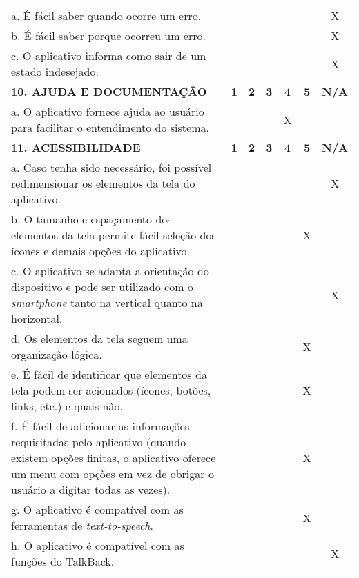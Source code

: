 \documentclass[portuguese,oneside]{tcc}
\begin{document}
\begin{center}
\begin{longtabu}{|L{25em}|c|c|c|c|c|c|}
																												a. É fácil saber quando ocorre um erro.	& & & & & & X \\ 
																												b. É fácil saber porque ocorreu um erro. & & & & & & X \\ 
																												c. O aplicativo informa como sair de um estado indesejado. & & & & & & X \\ 
																												\textbf{10. AJUDA E DOCUMENTAÇÃO} & \textbf{1} & \textbf{2} & \textbf{3} & \textbf{4} & \textbf{5} & \textbf{N/A} \\ 
																												a. O aplicativo fornece ajuda ao usuário para facilitar o entendimento do sistema. & & & & X & & \\ 
																												\textbf{11. ACESSIBILIDADE} & \textbf{1} & \textbf{2} & \textbf{3} & \textbf{4} & \textbf{5} & \textbf{N/A} \\ 
																												a. Caso tenha sido necessário, foi possível redimensionar os elementos da tela do aplicativo. & & & & & & X \\ 
																												b. O tamanho e espaçamento dos elementos da tela permite fácil seleção dos ícones e demais opções do aplicativo. & & & & & X & \\ 
																												c. O aplicativo se adapta a orientação do dispositivo e pode ser utilizado com o \emph{smartphone} tanto na vertical quanto na horizontal. & & & & & & X \\ 
																												d. Os elementos da tela seguem uma organização lógica. & & & & & X & \\ 
																												e. É fácil de identificar que elementos da tela podem ser acionados (ícones, botões, links, etc.) e quais não. & & & & & X & \\ 
																												f. É fácil de adicionar as informações requisitadas pelo aplicativo (quando existem opções finitas, o aplicativo oferece um menu com opções em vez de obrigar o usuário a digitar todas as vezes). & & & & & X & \\ 
																												g. O aplicativo é compatível com as ferramentas de \emph{text-to-speech}. & & & & & X & \\ 
																												h. O aplicativo é compatível com as funções do TalkBack. & & & & & & X \\ 

\end{longtabu}
\end{center}
\end{document}

